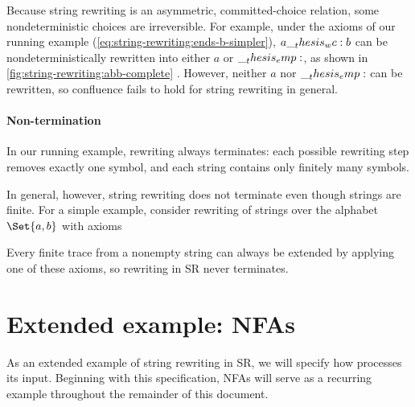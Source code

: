 Because string rewriting is an asymmetric, committed-choice relation, some nondeterministic choices are irreversible.
For example, under the axioms of our running example (\cref{eq:string-rewriting:ends-b-simpler}), $a \wc b$ can be nondeterministically rewritten into either $a$ or $\__thesis_emp:$, as shown in \cref{fig:string-rewriting:abb-complete}%
.
However, neither $a$ nor $\__thesis_emp:$ can be rewritten, so confluence fails to hold for string rewriting in general.

\paragraph*{Non-termination}
In our running example, rewriting always terminates: each possible rewriting step removes exactly one symbol, and each string contains only finitely many symbols.

In general, however, string rewriting does not terminate even though strings are finite.
For a simple example, consider rewriting of strings over the alphabet $\Set{a,b}$ with axioms
Every finite trace from a nonempty string can always be extended by applying one of these axioms, so rewriting in \ac{SR} never terminates.


\section{Extended example: \Aclp*{NFA}}\label{sec:string-rewriting:nfa}

As an extended example of string rewriting in \ac{SR}, we will specify how  processes its input.
Beginning with this specification, \acp{NFA} will serve as a recurring example throughout the remainder of this document.
 
